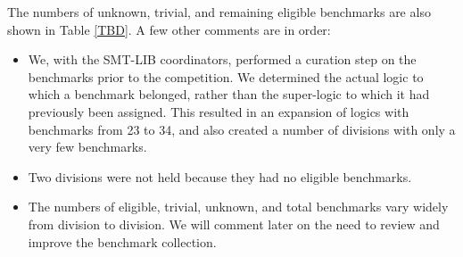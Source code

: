 \documentclass[twosize,11pt]{article}
\begin{document}
The numbers of unknown, trivial, and remaining eligible benchmarks are also shown in Table \ref{TBD}. A few other comments are in order:
\begin{itemize}
\item We, with the SMT-LIB coordinators, performed a curation step on the benchmarks prior to the competition. We determined the actual logic to which a benchmark belonged, rather than the super-logic
to which it had previously been assigned. This resulted in an expansion of logics with benchmarks from 23 to 34, and also created a number of divisions with only a very few benchmarks.
\item Two divisions were not held because they had no eligible benchmarks.
\item The numbers of eligible, trivial, unknown, and total benchmarks vary widely from division to division. We will comment later on the need to review and improve the benchmark collection.
\end{itemize}
\end{document}

